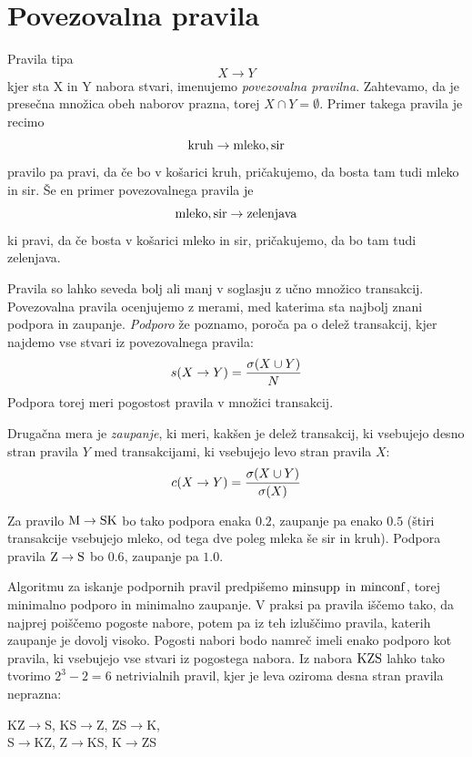 \section{Povezovalna pravila}

Pravila tipa
$$ X\rightarrow Y $$
kjer sta X in Y nabora stvari, imenujemo {\em povezovalna pravilna}. Zahtevamo, da je presečna množica obeh naborov prazna, torej $X\cap Y=\emptyset$. Primer takega pravila je recimo
$$ {\rm kruh}\to {\rm mleko}, {\rm sir}$$
pravilo pa pravi, da če bo v košarici kruh, pričakujemo, da bosta tam tudi mleko in sir. Še en primer povezovalnega pravila je
$$ {\rm mleko}, {\rm sir}\to {\rm zelenjava} $$
ki pravi, da če bosta v košarici mleko in sir, pričakujemo, da bo tam tudi zelenjava.

Pravila so lahko seveda bolj ali manj v soglasju z učno množico transakcij. Povezovalna pravila ocenjujemo z merami, med katerima sta najbolj znani podpora in zaupanje. {\em Podporo} že poznamo, poroča pa o delež transakcij, kjer najdemo vse stvari iz povezovalnega pravila:
\begin{equation}
  s(X\to Y)={\sigma(X\cup Y)\over N}
\end{equation}
Podpora torej meri pogostost pravila v množici transakcij.

Drugačna mera je {\em zaupanje}, ki meri, kakšen je delež transakcij, ki vsebujejo desno stran pravila $Y$ med transakcijami, ki vsebujejo levo stran pravila $X$:
\begin{equation}
  c(X\to Y)={\sigma(X\cup Y)\over\sigma(X)}
\end{equation}

Za pravilo ${\rm M}\to {\rm SK}$ bo tako podpora enaka $0.2$, zaupanje pa enako $0.5$ (štiri transakcije vsebujejo mleko, od tega dve poleg mleka še sir in kruh). Podpora pravila ${\rm Z}\to{\rm S}$ bo $0.6$, zaupanje pa $1.0$.

Algoritmu za iskanje podpornih pravil predpišemo ${\rm minsupp}$ in ${\rm minconf}$, torej minimalno podporo in minimalno zaupanje. V praksi pa pravila iščemo tako, da najprej poiščemo pogoste nabore, potem pa iz teh izluščimo pravila, katerih zaupanje je dovolj visoko. Pogosti nabori bodo namreč imeli enako podporo kot pravila, ki vsebujejo vse stvari iz pogostega nabora. Iz nabora ${\rm KZS}$ lahko tako tvorimo $2^3-2=6$ netrivialnih pravil, kjer je leva oziroma desna stran pravila neprazna:

\begin{center}
  KZ$\to$S, KS$\to$Z, ZS$\to$K, \\
  S$\to$KZ, Z$\to$KS, K$\to$ZS
\end{center}

